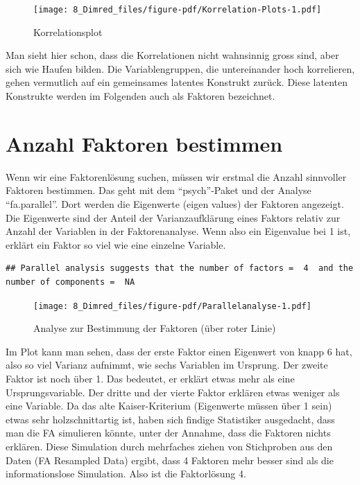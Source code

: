 \documentclass[
  10pt,
  letterpaper,
  a4paper, twoside]{scrreprt}
\begin{document}
\begin{figure}[H]

{\centering \texttt{[image: 8\_Dimred\_files/figure-pdf/Korrelation-Plots-1.pdf]}

}

\caption{Korrelationsplot}

\end{figure}%

Man sieht hier schon, dass die Korrelationen nicht wahnsinnig gross
sind, aber sich wie Haufen bilden. Die Variablengruppen, die
untereinander hoch korrelieren, gehen vermutlich auf ein gemeinsames
latentes Konstrukt zurück. Diese latenten Konstrukte werden im Folgenden
auch als Faktoren bezeichnet.

\section{Anzahl Faktoren bestimmen}\label{anzahl-faktoren-bestimmen}

Wenn wir eine Faktorenlösung suchen, müssen wir erstmal die Anzahl
sinnvoller Faktoren bestimmen. Das geht mit dem \enquote{psych}-Paket
und der Analyse \enquote{fa.parallel}. Dort werden die Eigenwerte (eigen
values) der Faktoren angezeigt. Die Eigenwerte sind der Anteil der
Varianzaufklärung eines Faktors relativ zur Anzahl der Variablen in der
Faktorenanalyse. Wenn also ein Eigenvalue bei 1 ist, erklärt ein Faktor
so viel wie eine einzelne Variable.

\begin{verbatim}
## Parallel analysis suggests that the number of factors =  4  and the number of components =  NA
\end{verbatim}

\begin{figure}[H]

{\centering \texttt{[image: 8\_Dimred\_files/figure-pdf/Parallelanalyse-1.pdf]}

}

\caption{Analyse zur Bestimmung der Faktoren (über roter Linie)}

\end{figure}%

Im Plot kann man sehen, dass der erste Faktor einen Eigenwert von knapp
6 hat, also so viel Varianz aufnimmt, wie sechs Variablen im Ursprung.
Der zweite Faktor ist noch über 1. Das bedeutet, er erklärt etwas mehr
als eine Ursprungsvariable. Der dritte und der vierte Faktor erklären
etwas weniger als eine Variable. Da das alte Kaiser-Kriterium
(Eigenwerte müssen über 1 sein) etwas sehr holzschnittartig ist, haben
sich findige Statistiker ausgedacht, dass man die FA simulieren könnte,
unter der Annahme, dass die Faktoren nichts erklären. Diese Simulation
durch mehrfaches ziehen von Stichproben aus den Daten (FA Resampled
Data) ergibt, dass 4 Faktoren mehr besser sind als die informationslose
Simulation. Also ist die Faktorlösung 4.
\end{document}

